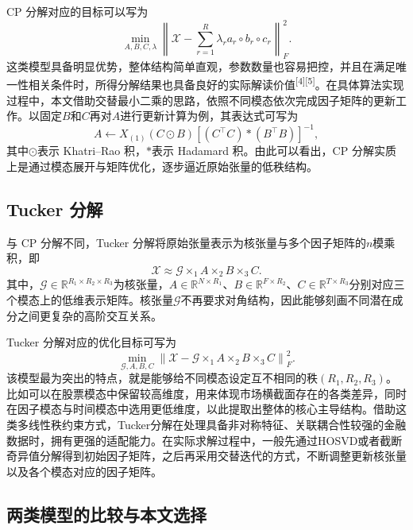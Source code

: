 CP 分解对应的目标可以写为
\begin{equation}
\min_{A,B,C,\lambda}\left\|\mathcal{X}-\sum_{r=1}^{R}\lambda_r a_r\circ b_r\circ c_r\right\|_F^2.
\end{equation}
这类模型具备明显优势，整体结构简单直观，参数数量也容易把控，并且在满足唯一性相关条件时，所得分解结果也具备良好的实际解读价值\textsuperscript{[4][5]}。在具体算法实现过程中，本文借助交替最小二乘的思路，依照不同模态依次完成因子矩阵的更新工作。以固定$B$和$C$再对$A$进行更新计算为例，其表达式可写为
\begin{equation}
A\leftarrow X_{(1)}(C\odot B)\left[(C^{\top}C)\ast(B^{\top}B)\right]^{-1},
\end{equation}
其中$\odot$表示 Khatri--Rao 积，$\ast$表示 Hadamard 积。由此可以看出，CP 分解实质上是通过模态展开与矩阵优化，逐步逼近原始张量的低秩结构。

\subsection{Tucker 分解}

与 CP 分解不同，Tucker 分解将原始张量表示为核张量与多个因子矩阵的$n$模乘积，即
\begin{equation}
\mathcal{X}\approx \mathcal{G}\times_1 A\times_2 B\times_3 C.
\end{equation}
其中，$\mathcal{G}\in\mathbb{R}^{R_1\times R_2\times R_3}$为核张量，$A\in\mathbb{R}^{N\times R_1}$、$B\in\mathbb{R}^{F\times R_2}$、$C\in\mathbb{R}^{T\times R_3}$分别对应三个模态上的低维表示矩阵。核张量$\mathcal{G}$不再要求对角结构，因此能够刻画不同潜在成分之间更复杂的高阶交互关系。

Tucker 分解对应的优化目标可写为
\begin{equation}
\min_{\mathcal{G},A,B,C}\left\|\mathcal{X}-\mathcal{G}\times_1 A\times_2 B\times_3 C\right\|_F^2.
\end{equation}
该模型最为突出的特点，就是能够给不同模态设定互不相同的秩$(R_1,R_2,R_3)$。比如可以在股票模态中保留较高维度，用来体现市场横截面存在的各类差异，同时在因子模态与时间模态中选用更低维度，以此提取出整体的核心主导结构。借助这类多线性秩约束方式，Tucker分解在处理具备非对称特征、关联耦合性较强的金融数据时，拥有更强的适配能力。在实际求解过程中，一般先通过HOSVD或者截断奇异值分解得到初始因子矩阵，之后再采用交替迭代的方式，不断调整更新核张量以及各个模态对应的因子矩阵。

\subsection{两类模型的比较与本文选择}

